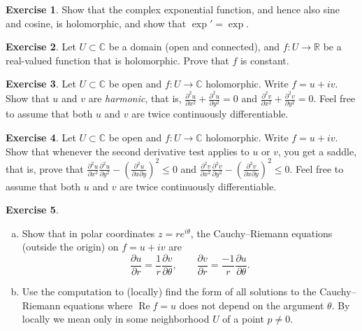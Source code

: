 \documentclass[12pt,openany]{book}
\renewcommand{\Re}{\operatorname{Re}}
\newcommand{\C}{{\mathbb{C}}}
\newcommand{\R}{{\mathbb{R}}}
\newcommand{\myindex}[1]{#1\index{#1}}
\theoremstyle{plain}
\theoremstyle{remark}
\theoremstyle{definition}
\newenvironment{exbox}{%
    \def\FrameCommand{\vrule width 1pt \relax\hspace{10pt}}%
    \MakeFramed{\advance\hsize-\width\FrameRestore}%
}{%
    \endMakeFramed
}
\newenvironment{exparts}{%
    \leavevmode\begin{enumerate}[a),noitemsep,topsep=0pt,parsep=0pt,partopsep=0pt]
}{%
    \end{enumerate}
}
\theoremstyle{exercise}
\newtheorem{exercise}{Exercise}[section]
\theoremstyle{example}
\begin{document}
\begin{exbox}
\begin{exercise} \label{exercise:exponentialholomorphic}
Show that the complex exponential function, and hence also sine and cosine,
is holomorphic, and show that $\exp' = \exp$.
\end{exercise}

\begin{exercise}
Let $U \subset \C$ be a domain (open and connected),
and $f \colon U \to \R$ be a real-valued function that is holomorphic.
Prove that $f$ is constant.
\end{exercise}

\begin{exercise}
Let $U \subset \C$ be open and $f \colon U \to \C$ holomorphic.
Write $f = u+iv$.  Show that $u$ and $v$ are \emph{\myindex{harmonic}},
that is,
$\frac{\partial^2 u}{\partial x^2} +  \frac{\partial^2 u}{\partial y^2} = 0$
and
$\frac{\partial^2 v}{\partial x^2} +  \frac{\partial^2 v}{\partial y^2} = 0$.
Feel free to assume that both $u$ and $v$ are twice continuously
differentiable.
\end{exercise}

\begin{exercise}
Let $U \subset \C$ be open and $f \colon U \to \C$ holomorphic.
Write $f = u+iv$.  Show that whenever the second derivative test applies 
to $u$ or $v$, you get a saddle, that is, prove that
$\frac{\partial^2 u}{\partial x^2} \frac{\partial^2 u}{\partial y^2}
-{\left(\frac{\partial^2 u}{\partial x \partial y}\right)}^2 \leq 0$
and
$\frac{\partial^2 v}{\partial x^2} \frac{\partial^2 v}{\partial y^2}
-{\left(\frac{\partial^2 v}{\partial x \partial y}\right)}^2 \leq 0$.
Feel free to assume that both $u$ and $v$ are twice continuously
differentiable.
\end{exercise}

\begin{exercise}
\begin{exparts}
\item
Show that in polar coordinates $z=re^{i\theta}$,
the Cauchy--Riemann equations (outside the origin) on $f=u+iv$ are
\begin{equation*}
\frac{\partial u}{\partial r} = \frac{1}{r} \frac{\partial v}{\partial \theta},
\qquad
\frac{\partial v}{\partial r} = \frac{-1}{r} \frac{\partial u}{\partial \theta}.
\end{equation*}
\item
Use the computation to (locally) find the form of all solutions to 
the Cauchy--Riemann equations where $\Re f = u$ does not depend on the
argument $\theta$.  By locally we mean only in some neighborhood $U$ of a
point $p \not= 0$.
\end{exparts}
\end{exercise}
\end{exbox}
\end{document}
